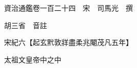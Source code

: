 










 


 
 


 

  
  
  
  
  





  
  
  
  
  
 
  

  

  
  
  



  

 
 

  
   




  

  
  


  　　資治通鑑卷一百二十四　宋　司馬光　撰

　　胡三省　音註

　　宋紀六【起玄黓敦牂盡柔兆閹茂凡五年】

　　太祖文皇帝中之中

